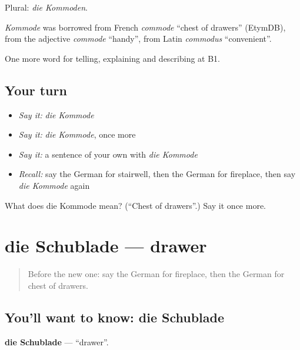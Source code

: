 Plural: \emph{die Kommoden}.

\begin{cousinweb}
\emph{Kommode} was borrowed from French \emph{commode} \textquotedblleft{}chest of drawers\textquotedblright{} (EtymDB), from the adjective \emph{commode} \textquotedblleft{}handy\textquotedblright{}, from Latin \emph{commodus} \textquotedblleft{}convenient\textquotedblright{}.
\end{cousinweb}

\begin{grammarlens}[title={What you've built}]
One more word for telling, explaining and describing at B1.
\end{grammarlens}

\subsection*{Your turn}
\begin{itemize}
\raggedright
  \item \emph{Say it:} \emph{die Kommode}
  \item \emph{Say it:} \emph{die Kommode}, once more
  \item \emph{Say it:} a sentence of your own with \emph{die Kommode}
  \item \emph{Recall:} say the German for stairwell, then the German for fireplace, then say \emph{die Kommode} again
\end{itemize}

\begin{tcolorbox}[breakable,colback=teal!4,colframe=teal!35!black,title={Before you move on}]
What does die Kommode mean? (\textquotedblleft{}Chest of drawers\textquotedblright{}.) Say it once more.
\end{tcolorbox}
\section[die Schublade]{die Schublade — drawer}

\label{lesson:GE-C533-schublade}



\begin{quote}
Before the new one: say the German for fireplace, then the German for chest of drawers.
\end{quote}

\subsection*{You'll want to know: die Schublade}
\textbf{die Schublade} — \textquotedblleft{}drawer\textquotedblright{}.

